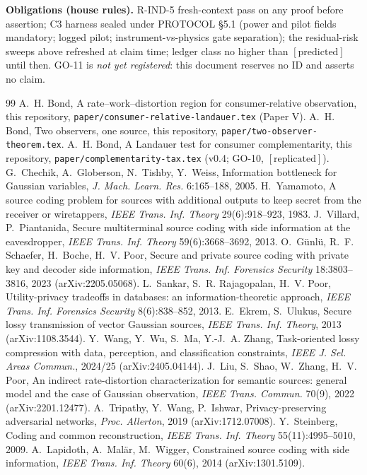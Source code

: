 \documentclass[11pt]{article}
\begin{document}
\textbf{Obligations (house rules).} R-IND-5 fresh-context pass on any proof
before assertion; C3 harness sealed under PROTOCOL \S5.1 (power and pilot
fields mandatory; logged pilot; instrument-vs-physics gate separation); the
residual-risk sweeps above refreshed at claim time; ledger class no higher
than $[\mathrm{predicted}]$ until then. GO-11 is \emph{not yet registered}:
this document reserves no ID and asserts no claim.

\begin{thebibliography}{99}
 A.~H. Bond, A rate--work--distortion region for
consumer-relative observation, this repository,
\texttt{paper/consumer-relative-landauer.tex} (Paper V).
 A.~H. Bond, Two observers, one source, this
repository, \texttt{paper/two-observer-theorem.tex}.
 A.~H. Bond, A Landauer test for consumer
complementarity, this repository, \texttt{paper/complementarity-tax.tex}
(v0.4; GO-10, $[\mathrm{replicated}]$).
 G.~Chechik, A.~Globerson, N.~Tishby, Y.~Weiss,
Information bottleneck for Gaussian variables, \emph{J. Mach. Learn. Res.}
6:165--188, 2005.
 H.~Yamamoto, A source coding problem for sources
with additional outputs to keep secret from the receiver or wiretappers,
\emph{IEEE Trans. Inf. Theory} 29(6):918--923, 1983.
 J.~Villard, P.~Piantanida, Secure multiterminal
source coding with side information at the eavesdropper, \emph{IEEE Trans.
Inf. Theory} 59(6):3668--3692, 2013.
 O.~G\"unl\"u, R.~F. Schaefer, H.~Boche, H.~V. Poor,
Secure and private source coding with private key and decoder side
information, \emph{IEEE Trans. Inf. Forensics Security} 18:3803--3816,
2023 (arXiv:2205.05068).
 L.~Sankar, S.~R. Rajagopalan, H.~V. Poor,
Utility-privacy tradeoffs in databases: an information-theoretic approach,
\emph{IEEE Trans. Inf. Forensics Security} 8(6):838--852, 2013.
 E.~Ekrem, S.~Ulukus, Secure lossy transmission of
vector Gaussian sources, \emph{IEEE Trans. Inf. Theory}, 2013
(arXiv:1108.3544).
 Y.~Wang, Y.~Wu, S.~Ma, Y.-J.~A. Zhang, Task-oriented
lossy compression with data, perception, and classification constraints,
\emph{IEEE J. Sel. Areas Commun.}, 2024/25 (arXiv:2405.04144).
 J.~Liu, S.~Shao, W.~Zhang, H.~V. Poor, An
indirect rate-distortion characterization for semantic sources: general
model and the case of Gaussian observation, \emph{IEEE Trans. Commun.}
70(9), 2022 (arXiv:2201.12477).
 A.~Tripathy, Y.~Wang, P.~Ishwar, Privacy-preserving
adversarial networks, \emph{Proc. Allerton}, 2019 (arXiv:1712.07008).
 Y.~Steinberg, Coding and common reconstruction,
\emph{IEEE Trans. Inf. Theory} 55(11):4995--5010, 2009.
 A.~Lapidoth, A.~Mal\"ar, M.~Wigger, Constrained source
coding with side information, \emph{IEEE Trans. Inf. Theory} 60(6), 2014
(arXiv:1301.5109).
\end{thebibliography}
\end{document}
